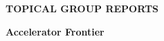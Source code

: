 

  \vfill

\begin{center}
\begin{Huge}   {\bf  TOPICAL GROUP REPORTS}

\bigskip

\bigskip

 {\bf Accelerator  Frontier }

\vfill

\vfill

\end{Huge}
\end{center}

\newpage
\thispagestyle{empty}
\mbox{\null}


